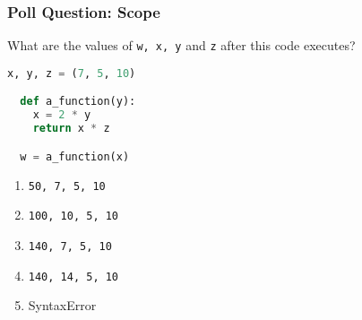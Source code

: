 \documentclass{beamer}
\begin{document}
%
%
\begin{frame}[fragile]
  \frametitle{Poll Question: Scope}
  What are the values of \lstinline|w, x, y| and \lstinline|z| after this code executes?
  \begin{lstlisting}[language=Python, autogobble]
  x, y, z = (7, 5, 10)

  def a_function(y):
    x = 2 * y
    return x * z

  w = a_function(x)
  \end{lstlisting}
  \vfill
  \begin{enumerate}[A]
    \item \lstinline|50, 7, 5, 10|
    \item \lstinline|100, 10, 5, 10|
    \item \lstinline|140, 7, 5, 10|
    \item \lstinline|140, 14, 5, 10|
    \item SyntaxError
  \end{enumerate}
\end{frame}
\end{document}
